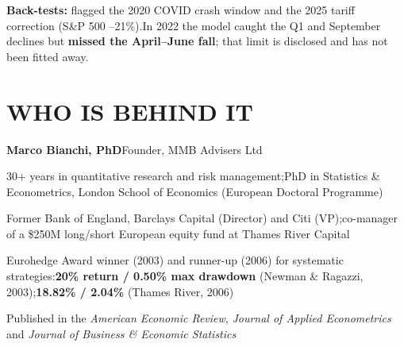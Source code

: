 \documentclass[a4paper,11pt]{article}
\begin{document}
{\footnotesize\textbf{Back-tests:} flagged the 2020 COVID crash window and the 2025 tariff correction (S\&P 500 --21\%).\enspace In 2022 the model caught the Q1 and September declines but \textbf{missed the April--June fall}; that limit is disclosed and has not been fitted away.}

\vspace{0.2em}

\vspace{0.2cm}

\noindent
\begin{minipage}[t]{0.58\linewidth}
\section{WHO IS BEHIND IT}

{\footnotesize\textbf{Marco Bianchi, PhD}\enspace\textperiodcentered\enspace Founder, MMB Advisers Ltd}

\vspace{0.15em}
\begin{itemize}
  {\footnotesize\item 30+ years in quantitative research and risk management;\enspace PhD in Statistics \& Econometrics, London School of Economics (European Doctoral Programme)}
  {\footnotesize\item Former Bank of England, Barclays Capital (Director) and Citi (VP);\enspace co-manager of a \$250M long/short European equity fund at Thames River Capital}
  {\footnotesize\item Eurohedge Award winner (2003) and runner-up (2006) for systematic strategies:\enspace \textbf{20\% return / 0.50\% max drawdown} (Newman \& Ragazzi, 2003);\enspace \textbf{18.82\% / 2.04\%} (Thames River, 2006)}
  {\footnotesize\item Published in the \textit{American Economic Review}, \textit{Journal of Applied Econometrics} and \textit{Journal of Business \& Economic Statistics}}
\end{itemize}
\end{minipage}%
\hfill
\end{document}
